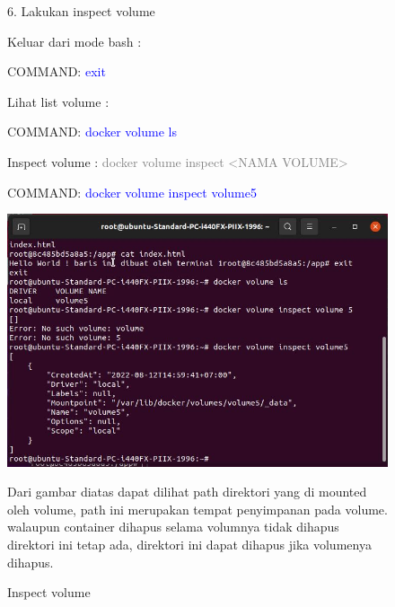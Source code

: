 \begin{figure}
    6. Lakukan inspect volume 
    
    Keluar dari mode bash :
    
    COMMAND: \textcolor{Blue}{exit}
    
    Lihat list volume :
    
    COMMAND: \textcolor{Blue}{docker volume ls}
    
    Inspect volume : \textcolor{Gray}{docker volume inspect <NAMA VOLUME>}
    
    COMMAND: \textcolor{Blue}{docker volume inspect volume5}
        \begin{center}
            \includegraphics[width=\linewidth]{image/66.jpg}
            \caption{Inspect volume}
            \label{fig:my_figure}
        \end{center}

    Dari gambar diatas dapat dilihat path direktori yang di mounted oleh volume, path ini merupakan
    tempat penyimpanan pada volume. walaupun container dihapus selama volumnya tidak dihapus 
    direktori ini tetap ada, direktori ini dapat dihapus jika volumenya dihapus.
\end{figure}

